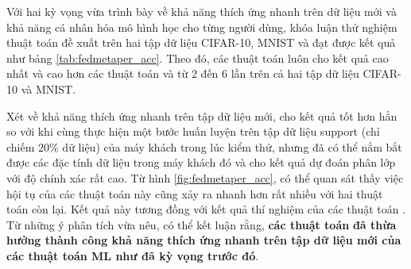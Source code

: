 Với hai kỳ vọng vừa trình bày về khả năng thích ứng nhanh trên dữ liệu mới và khả năng cá nhân hóa mô hình học cho từng người dùng, khóa luận thử nghiệm thuật toán đề xuất trên hai tập dữ liệu CIFAR-10, MNIST và đạt được kết quả như bảng \ref{tab:fedmetaper_acc}. Theo đó, các thuật toán  luôn cho kết quả cao nhất và cao hơn các thuật toán  và  từ 2 đến 6 lần trên cả hai tập dữ liệu CIFAR-10 và MNIST.

\begin{table}
    \centering
    \caption{Bảng độ chính xác (\%) của thuật toán FedPer và các thuật toán FedMeta-Per tính trên điểm dữ liệu (dữ liệu Non-IID)}
    \label{tab:fedmetaper_acc}
\end{table}

Xét về khả năng thích ứng nhanh trên tập dữ liệu mới,  cho kết quả tốt hơn hẳn so với  khi cùng thực hiện một bước huấn luyện trên tập dữ liệu support (chỉ chiếm 20\% dữ liệu) của máy khách trong lúc kiểm thử, nhưng đã có thể nắm bắt được các đặc tính dữ liệu trong máy khách đó và cho kết quả dự đoán phân lớp với độ chính xác rất cao. Từ hình \ref{fig:fedmetaper_acc}, có thể quan sát thấy việc hội tụ của các thuật toán này cũng xảy ra nhanh hơn rất nhiều với hai thuật toán còn lại. Kết quả này tương đồng với kết quả thí nghiệm của các thuật toán . Từ những ý phân tích vừa nêu, có thể kết luận rằng, \textbf{các thuật toán}  \textbf{đã thừa hưởng thành công khả năng thích ứng nhanh trên tập dữ liệu mới của các thuật toán ML như đã kỳ vọng trước đó}.

